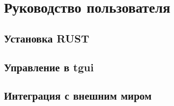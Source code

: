 \section{Руководство пользователя}

\subsection{Установка RUST}

\subsection{Управление в tgui}

\subsection{Интеграция с внешним миром }
